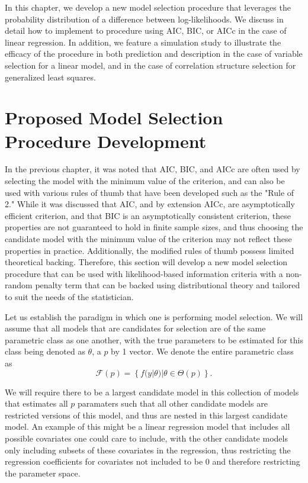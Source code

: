 \doublespace		
{}
		In this chapter, we develop a new model selection procedure that leverages the probability distribution of a difference between log-likelihoods. We discuss in detail how
		to implement to procedure using AIC, BIC, or AICc in the case of linear regression.  In addition, we feature a simulation study to illustrate the efficacy of the procedure
		in both prediction and description in the case of variable selection for a linear model, and in the case of correlation structure selection for generalized least squares.

		\section{Proposed Model Selection Procedure Development} \label{sec:proposed_method}
		In the previous chapter, it was noted that AIC, BIC, and AICc are often used by selecting the model with the minimum value of the criterion, and can also be used with
		various rules of thumb that have been developed such as the "Rule of 2." While it was discussed that AIC, and by extension AICc, are asymptotically efficient criterion,
		and that BIC is an asymptotically consistent criterion, these properties are not guaranteed to hold in finite sample sizes, and thus choosing the candidate model with
		the minimum value of the criterion may not reflect these properties in practice. Additionally, the modified rules of thumb possess limited theoretical backing. Therefore,
		this section will develop a new model selection procedure that can be used with likelihood-based information criteria with a non-random penalty term that can be backed
		using distributional theory and tailored to suit the needs of the statistician.
		
		Let us establish the paradigm in which one is performing model selection. We will assume that all models that are candidates for selection are of the same parametric
		class as one another, with the true parameters to be estimated for this class being denoted as $\theta$, a $p$ by 1 vector. We denote the entire parametric class as
		\begin{equation}
			\mathcal{F}(p) = \left\{ f(y|\theta) | \theta \in \Theta(p) \right\} .
		\end{equation}

		We will require there to be a largest candidate model in this collection of models that estimates all $p$ paramaters such that all other candidate models are restricted
		versions of this model, and thus are nested in this largest candidate model. An example of this might be a linear regression model that includes all possible covariates
		one could care to include, with the other candidate models only including subsets of these covariates in the regression, thus restricting the regression coefficients for
		covariates not included to be 0 and therefore restricting the parameter space.

